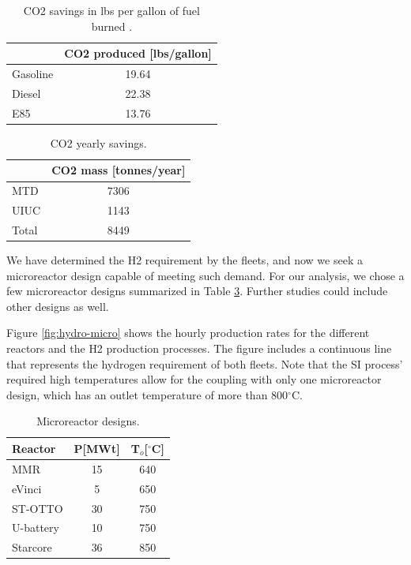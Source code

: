 	\begin{table}[htbp!]
		\centering
	    \caption{\gls{CO2} savings in lbs per gallon of fuel burned \cite{energy_information_administration_how_2014}.}
		\begin{tabular}{l|c}
		\hline
		              & \gls{CO2} produced [lbs/gallon] \\ \hline
		Gasoline      & 19.64           \\
		Diesel        & 22.38           \\
		E85           & 13.76           \\ \hline
        \end{tabular}
        \label{tab:co2-eq}
	\end{table}

	\begin{table}[htbp!]
		\centering
	    \caption{\gls{CO2} yearly savings.}
		\begin{tabular}{l|c}
		\hline
		            & \gls{CO2} mass [tonnes/year] \\ \hline
		MTD      	  & 7306           \\
		UIUC        & 1143           \\
		Total       & 8449           \\ \hline
        \end{tabular}
        \label{tab:co2}
	\end{table}

We have determined the \gls{H2} requirement by the fleets, and now we seek a microreactor design capable of meeting such demand.
For our analysis, we chose a few microreactor designs summarized in Table \ref{tab:hydro-micro}.
Further studies could include other designs as well.

Figure \ref{fig:hydro-micro} shows the hourly production rates for the different reactors and the \gls{H2} production processes.
The figure includes a continuous line that represents the hydrogen requirement of both fleets.
Note that the \gls{SI} process' required high temperatures allow for the coupling with only one microreactor design, which has an outlet temperature of more than 800$^{\circ}$C.

	\begin{table}[htbp!]
		\centering
	    \caption{Microreactor designs.}
		\begin{tabular}{l|cc}
		\hline
		Reactor                                      & P[MWt] & T$_o$[$^\circ$C] \\ \hline
		MMR \cite{usnc_mmr_2019}  		             & 15           & 640              \\
		eVinci \cite{hernandez_micro_2019}           & 5            & 650              \\
		ST-OTTO \cite{harlan_x-energy_2018}          & 30           & 750              \\
		U-battery \cite{ding_design_2011}            & 10           & 750              \\
		Starcore \cite{star_core_nuclear_star_2015}  & 36           & 850              \\ \hline
        \end{tabular}
        \label{tab:hydro-micro}
	\end{table}


